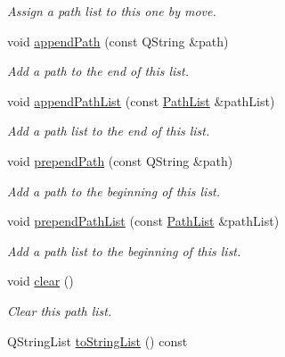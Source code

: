 \begin{DoxyCompactItemize}
\begin{DoxyCompactList}\small\item\em Assign a path list to this one by move. \end{DoxyCompactList}\item 
void \hyperlink{class_mdt_1_1_deploy_utils_1_1_path_list_a2d8d99897e5a693e761f6df4523b115c}{append\+Path} (const Q\+String \&path)
\begin{DoxyCompactList}\small\item\em Add a path to the end of this list. \end{DoxyCompactList}\item 
void \hyperlink{class_mdt_1_1_deploy_utils_1_1_path_list_a1d83d10599fac6d015a6779153364ab3}{append\+Path\+List} (const \hyperlink{class_mdt_1_1_deploy_utils_1_1_path_list}{Path\+List} \&path\+List)
\begin{DoxyCompactList}\small\item\em Add a path list to the end of this list. \end{DoxyCompactList}\item 
void \hyperlink{class_mdt_1_1_deploy_utils_1_1_path_list_a3fcd8dbdb27b4ead271623a46fa81b38}{prepend\+Path} (const Q\+String \&path)
\begin{DoxyCompactList}\small\item\em Add a path to the beginning of this list. \end{DoxyCompactList}\item 
void \hyperlink{class_mdt_1_1_deploy_utils_1_1_path_list_a681de54da92349f89f1df37c876e0c67}{prepend\+Path\+List} (const \hyperlink{class_mdt_1_1_deploy_utils_1_1_path_list}{Path\+List} \&path\+List)
\begin{DoxyCompactList}\small\item\em Add a path list to the beginning of this list. \end{DoxyCompactList}\item 
void \hyperlink{class_mdt_1_1_deploy_utils_1_1_path_list_a341e4b7de4f7c6ed11769bd4449aa013}{clear} ()\hypertarget{class_mdt_1_1_deploy_utils_1_1_path_list_a341e4b7de4f7c6ed11769bd4449aa013}{}\label{class_mdt_1_1_deploy_utils_1_1_path_list_a341e4b7de4f7c6ed11769bd4449aa013}

\begin{DoxyCompactList}\small\item\em Clear this path list. \end{DoxyCompactList}\item 
Q\+String\+List \hyperlink{class_mdt_1_1_deploy_utils_1_1_path_list_afd40c0f5d21c285bb5f1778a8832167e}{to\+String\+List} () const \hypertarget{class_mdt_1_1_deploy_utils_1_1_path_list_afd40c0f5d21c285bb5f1778a8832167e}{}\label{class_mdt_1_1_deploy_utils_1_1_path_list_afd40c0f5d21c285bb5f1778a8832167e}


\end{DoxyCompactItemize}
